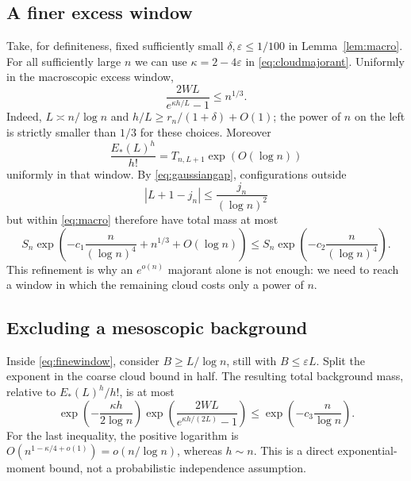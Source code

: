 \documentclass[11pt,a4paper]{article}
\numberwithin{equation}{section}
\theoremstyle{definition}\newtheorem{definition}[theorem]{Definition}
\theoremstyle{remark}\newtheorem{remark}[theorem]{Remark}
\theoremstyle{definition}
\begin{document}
\subsection{A finer excess window}
Take, for definiteness, fixed sufficiently small
\(\delta,\varepsilon\le1/100\) in Lemma~\ref{lem:macro}.
For all sufficiently large \(n\) we can use \(\kappa=2-4\varepsilon\)
in \eqref{eq:cloudmajorant}. Uniformly in the macroscopic excess window,
\begin{equation}
 \frac{2WL}{e^{\kappa h/L}-1}\le n^{1/3}.
 \label{eq:roughcloud}
\end{equation}
Indeed, \(L\asymp n/\log n\) and
\(h/L\ge r_n/(1+\delta)+O(1)\); the power of \(n\) on the left is
strictly smaller than \(1/3\) for these choices.
Moreover
\begin{equation}
 \frac{E_*(L)^h}{h!}
   =T_{n,L+1}\exp(O(\log n))
 \label{eq:reference-row}
\end{equation}
uniformly in that window. By \eqref{eq:gaussiangap}, configurations outside
\begin{equation}
 |L+1-j_n|\le\frac{j_n}{(\log n)^2}
 \label{eq:finewindow}
\end{equation}
but within \eqref{eq:macro} therefore have total mass at most
\begin{equation}
 S_n\exp\!\left(-c_1\frac{n}{(\log n)^4}+n^{1/3}+O(\log n)\right)
 \le S_n\exp\!\left(-c_2\frac{n}{(\log n)^4}\right).
 \label{eq:fineexception}
\end{equation}
This refinement is why an \(e^{o(n)}\) majorant alone is not enough: we need
to reach a window in which the remaining cloud costs only a power of \(n\).

\subsection{Excluding a mesoscopic background}
Inside \eqref{eq:finewindow}, consider \(B\ge L/\log n\), still with
\(B\le\varepsilon L\). Split the exponent in the coarse cloud bound in half.
The resulting total background mass, relative to \(E_*(L)^h/h!\), is at most
\begin{equation}
 \exp\!\left(-\frac{\kappa h}{2\log n}\right)
 \exp\!\left(\frac{2WL}{e^{\kappa h/(2L)}-1}\right)
 \le\exp\!\left(-c_3\frac{n}{\log n}\right).
 \label{eq:mesoscopic}
\end{equation}
For the last inequality, the positive logarithm is
\(O(n^{1-\kappa/4+o(1)})=o(n/\log n)\), whereas \(h\sim n\).
This is a direct exponential-moment bound, not a probabilistic independence
assumption.
\end{document}
